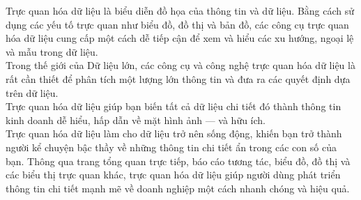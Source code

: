 Trực quan hóa dữ liệu là biểu diễn đồ họa của thông tin và dữ liệu. Bằng cách sử dụng các yếu tố trực quan như biểu đồ, đồ thị và bản đồ, các công cụ trực quan hóa dữ liệu cung cấp một cách dễ tiếp cận để xem và hiểu các xu hướng, ngoại lệ và mẫu trong dữ liệu.\\
Trong thế giới của Dữ liệu lớn, các công cụ và công nghệ trực quan hóa dữ liệu là rất cần thiết để phân tích một lượng lớn thông tin và đưa ra các quyết định dựa trên dữ liệu.\\
Trực quan hóa dữ liệu giúp bạn biến tất cả dữ liệu chi tiết đó thành thông tin kinh doanh dễ hiểu, hấp dẫn về mặt hình ảnh — và hữu ích.\\
Trực quan hóa dữ liệu làm cho dữ liệu trở nên sống động, khiến bạn trở thành người kể chuyện bậc thầy về những thông tin chi tiết ẩn trong các con số của bạn. Thông qua trang tổng quan trực tiếp, báo cáo tương tác, biểu đồ, đồ thị và các biểu thị trực quan khác, trực quan hóa dữ liệu giúp người dùng phát triển thông tin chi tiết mạnh mẽ về doanh nghiệp một cách nhanh chóng và hiệu quả.




